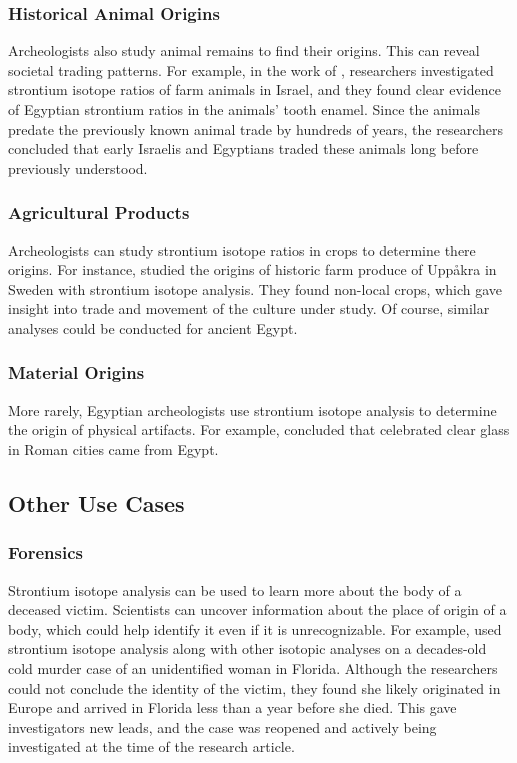 \documentclass[a4paper, 12pt]{article}
\begin{document}
\subsubsection{Historical Animal Origins}
Archeologists also study animal remains
to find their origins. This can reveal societal trading patterns. For example, in the work of \cite{arnold2016}, researchers investigated strontium isotope ratios of
farm animals in Israel, and they found clear evidence of
Egyptian strontium ratios in the animals' tooth enamel. Since the animals predate
the previously known animal trade by hundreds of years, the researchers concluded
that early Israelis and Egyptians traded these animals long before previously understood.

\subsubsection{Agricultural Products}
Archeologists can study strontium isotope ratios in crops to determine there origins.
For instance, \cite{larsson2020} studied the
origins of historic farm produce of Uppåkra in Sweden with strontium isotope analysis.
They found non-local crops, which
gave insight into trade and movement of the culture under study.
Of course, similar analyses could be conducted for ancient Egypt.


\subsubsection{Material Origins}
More rarely, Egyptian archeologists use strontium isotope analysis to determine the origin
of physical artifacts. For example, \cite{barfod2020} concluded that celebrated
clear glass in Roman cities came from Egypt.



\subsection{Other Use Cases}
\subsubsection{Forensics}
Strontium isotope analysis can be used to learn more about the body of a
deceased victim. Scientists can uncover information about the place of origin
of a body, which could help identify it even if it is unrecognizable. For example,
\cite{kamenov2014} used strontium isotope analysis along with other isotopic
analyses on a decades-old cold murder case of an unidentified woman in Florida.
Although the researchers could not conclude the identity of the victim, they
found she likely originated in Europe and arrived in Florida less than a year
before she died. This gave investigators new leads, and the case was
reopened and actively being investigated at the time of the research article.
\end{document}

